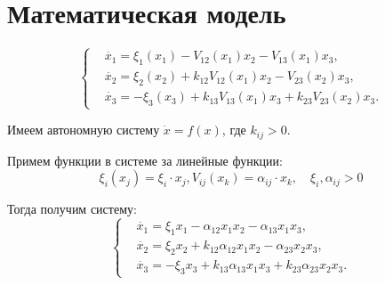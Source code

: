  \section{Математическая модель}
    \[
        \left\{\begin{split}
            & \dot{x_1} = \xi_1(x_1) - V_{12}(x_1)x_2 - V_{13}(x_1)x_3, \\
            & \dot{x_2} = \xi_2(x_2) + k_{12} V_{12}(x_1)x_2 - V_{23}(x_2)x_3, \\
            & \dot{x_3} = -\xi_3(x_3) + k_{13} V_{13}(x_1)x_3 + k_{23} V_{23}(x_2)x_3. 
        \end{split}\right.
    \]
    
    Имеем автономную систему \( \dot{x} = f(x) \), где \( k_{ij} > 0 \).

    Примем функции в системе за линейные функции: 
    \[ \xi_i(x_j) = \xi_i \cdot x_j, V_{ij}(x_k) = \alpha_{ij} \cdot x_k, \quad \xi_i, \alpha_{ij} > 0 \]

    Тогда получим систему:
    \[
        \left\{\begin{split}
            & \dot{x_1} = \xi_1 x_1 - \alpha_{12} x_1 x_2 - \alpha_{13} x_1 x_3, \\
            & \dot{x_2} = \xi_2 x_2 + k_{12} \alpha_{12} x_1 x_2 - \alpha_{23} x_2 x_3, \\
            & \dot{x_3} = -\xi_3 x_3 + k_{13} \alpha_{13} x_1 x_3 + k_{23} \alpha_{23} x_2 x_3. 
        \end{split}\right.
    \]